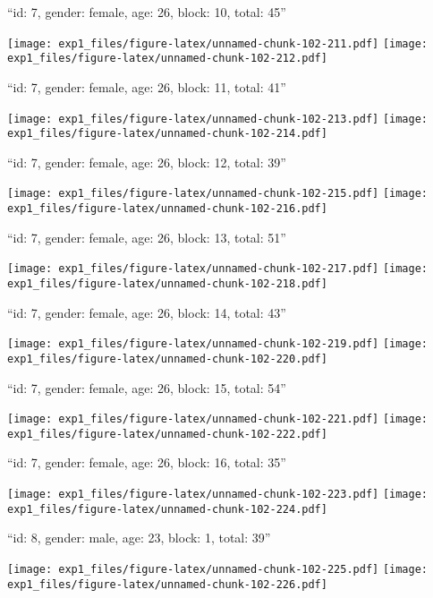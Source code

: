 \documentclass[11pt,,]{article}
\begin{document}
\newpage
[1] 

``id: 7, gender: female, age: 26, block: 10, total: 45''

\texttt{[image: exp1\_files/figure-latex/unnamed-chunk-102-211.pdf]}
\texttt{[image: exp1\_files/figure-latex/unnamed-chunk-102-212.pdf]}

\newpage
[1] 

``id: 7, gender: female, age: 26, block: 11, total: 41''

\texttt{[image: exp1\_files/figure-latex/unnamed-chunk-102-213.pdf]}
\texttt{[image: exp1\_files/figure-latex/unnamed-chunk-102-214.pdf]}

\newpage
[1] 

``id: 7, gender: female, age: 26, block: 12, total: 39''

\texttt{[image: exp1\_files/figure-latex/unnamed-chunk-102-215.pdf]}
\texttt{[image: exp1\_files/figure-latex/unnamed-chunk-102-216.pdf]}

\newpage
[1] 

``id: 7, gender: female, age: 26, block: 13, total: 51''

\texttt{[image: exp1\_files/figure-latex/unnamed-chunk-102-217.pdf]}
\texttt{[image: exp1\_files/figure-latex/unnamed-chunk-102-218.pdf]}

\newpage
[1] 

``id: 7, gender: female, age: 26, block: 14, total: 43''

\texttt{[image: exp1\_files/figure-latex/unnamed-chunk-102-219.pdf]}
\texttt{[image: exp1\_files/figure-latex/unnamed-chunk-102-220.pdf]}

\newpage
[1] 

``id: 7, gender: female, age: 26, block: 15, total: 54''

\texttt{[image: exp1\_files/figure-latex/unnamed-chunk-102-221.pdf]}
\texttt{[image: exp1\_files/figure-latex/unnamed-chunk-102-222.pdf]}

\newpage
[1] 

``id: 7, gender: female, age: 26, block: 16, total: 35''

\texttt{[image: exp1\_files/figure-latex/unnamed-chunk-102-223.pdf]}
\texttt{[image: exp1\_files/figure-latex/unnamed-chunk-102-224.pdf]}

\newpage
[1] 

``id: 8, gender: male, age: 23, block: 1, total: 39''

\texttt{[image: exp1\_files/figure-latex/unnamed-chunk-102-225.pdf]}
\texttt{[image: exp1\_files/figure-latex/unnamed-chunk-102-226.pdf]}
\end{document}
